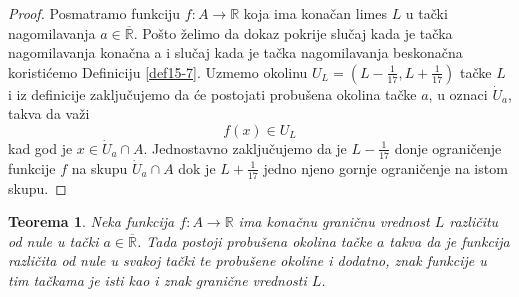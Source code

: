 \documentclass[a4paper,12pt]{article}
\theoremstyle{plain}
\newtheorem{theorem}{Teorema}[section]
\theoremstyle{definition}
\theoremstyle{remark}
\begin{document}
\begin{proof}
    Posmatramo funkciju $f : A \to \mathbb{R}$ koja ima konačan limes $L$ u tački nagomilavanja $a \in \overline{\mathbb{R}}$. Pošto želimo da dokaz pokrije slučaj kada je tačka nagomilavanja konačna a i slučaj kada je tačka nagomilavanja beskonačna koristićemo Definiciju \ref{def15-7}. Uzmemo okolinu \linebreak $\displaystyle U_L = \left(L - \frac{1}{17}, L + \frac{1}{17}\right)$ tačke $L$ i iz definicije zaključujemo da će postojati probušena okolina tačke $a$, u oznaci $\dot{U}_a$, takva da važi
    \[ f(x) \in U_L \]
    kad god je $x \in \dot{U}_a \cap A$. Jednostavno zaključujemo da je $\displaystyle L - \frac{1}{17}$ donje ograničenje funkcije $f$ na skupu $\dot{U}_a \cap A$ dok je $\displaystyle L + \frac{1}{17}$ jedno njeno gornje ograničenje na istom skupu.
\end{proof}
\begin{theorem}
    Neka funkcija $f : A \to \mathbb{R}$ ima konačnu graničnu vrednost $L$ različitu od nule u tački $a \in \overline{\mathbb{R}}$. Tada postoji probušena okolina tačke $a$ takva da je funkcija različita od nule u svakoj tački te probušene okoline i dodatno, znak funkcije u tim tačkama je isti kao i znak granične vrednosti $L$.
\end{theorem}
\end{document}
